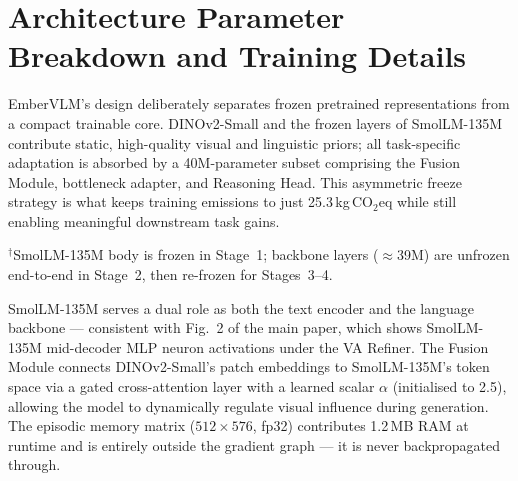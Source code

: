 \documentclass[runningheads]{llncs}
\begin{document}
\section{Architecture Parameter Breakdown and Training Details}
\label{sec:supp-arch}

EmberVLM's design deliberately separates frozen pretrained representations from a
compact trainable core. DINOv2-Small and the frozen layers of SmolLM-135M contribute
static, high-quality visual and linguistic priors; all task-specific adaptation is
absorbed by a 40M-parameter subset comprising the Fusion Module, bottleneck adapter,
and Reasoning Head. This asymmetric freeze strategy is what keeps training emissions
to just 25.3\,kg\,CO$_2$eq while still enabling meaningful downstream task gains.

\begin{table}[ht]
\centering
\caption{Parameter breakdown. Total: 164M; trainable: 40M.}
\label{tab:params}
\setlength{\tabcolsep}{5pt}

\end{table}

{\scriptsize $^\dagger$SmolLM-135M body is frozen in Stage~1; backbone layers ($\approx$39M) are
unfrozen end-to-end in Stage~2, then re-frozen for Stages~3--4.}

\smallskip\noindent
SmolLM-135M serves a dual role as both the text encoder and the language backbone —
consistent with Fig.~2 of the main paper, which shows SmolLM-135M mid-decoder MLP
neuron activations under the VA Refiner. The Fusion Module connects DINOv2-Small's
patch embeddings to SmolLM-135M's token space via a gated cross-attention layer with
a learned scalar $\alpha$ (initialised to 2.5), allowing the model to dynamically
regulate visual influence during generation. The episodic memory matrix
($512\!\times\!576$, fp32) contributes 1.2\,MB RAM at runtime and is entirely outside
the gradient graph — it is never backpropagated through.
\end{document}

